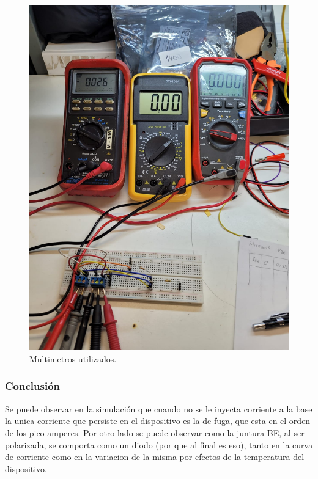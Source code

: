 \documentclass[chaptersright]{informeutn}
\begin{document}
\begin{figure}[H]
\begin{minipage}{0.40\textwidth}
          \includegraphics[width=\textwidth]{pictures/multimetros-juntura-be.jpeg}
          \caption{Multimetros utilizados.}
          \label{fig:multimetros}
        \end{minipage}
        \end{figure}

        \subsubsection{Conclusión}

          Se puede observar en la simulación que cuando no se le inyecta corriente a la base la unica corriente que
          persiste en el dispositivo es la de fuga, que esta en el orden de los pico-amperes. Por otro lado se puede
          observar como la juntura BE, al ser polarizada, se comporta como un diodo (por que al final es eso), tanto en
          la curva de corriente como en la variacion de la misma por efectos de la temperatura del dispositivo.
        
\end{document}
